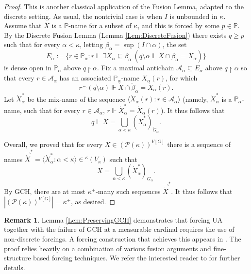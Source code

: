 \documentclass{article}
\theoremstyle{definition}
\newtheorem{remark}[definition]{Remark}
\theoremstyle{plain}
\newcommand{\po}{\mathbb{P}}
\newcommand{\la}{\langle}
\newcommand{\ra}{\rangle}
\newcommand{\uhr}{\upharpoonright}
\begin{document}
\begin{proof}
    This is another classical application of the Fusion Lemma,  adapted to the discrete setting. As usual, the nontrivial case is when $I$ is unbounded in $\kappa$. Assume that $\dot{X}$ is a $\po$-name for a subset of $\kappa$, and this is forced by some $p\in \po$. By the Discrete Fusion Lemma (Lemma \ref{Lem:DiscreteFusion}) there exists $q\geq p$ such that for every $\alpha<\kappa$, letting $\beta_\alpha = \sup(I\cap \alpha)$, the set
    $$ E_\alpha:=\{ r\in \po_\alpha \colon r\Vdash \exists X_\alpha\subseteq \beta_\alpha \ \left(q\setminus \alpha \Vdash \dot{X}\cap \beta_\alpha = X_\alpha \right) \}  $$
    is dense open in $\po_\alpha$ above $q\uhr \alpha$. Fix a maximal antichain $\mathcal{A}_\alpha\subseteq E_\alpha$ above $q\uhr \alpha$ so that every $r\in \mathcal{A}_\alpha$ has an associated $\po_\alpha$-name $\dot{X}_\alpha(r)$, for which 
    $$ r{}^\frown (q\setminus \alpha)\Vdash \dot{X}\cap \check{\beta}_\alpha = \dot{X}_\alpha(r). $$
    Let $\dot{X}^*_\alpha$ be the mix-name of the sequence $\la \dot{X}_\alpha(r) \colon r\in \mathcal{A}_\alpha  \ra$ (namely, $\dot{X}^*_\alpha$ is a $\po_\alpha$-name, such that for every $r\in \mathcal{A}_\alpha$, $r\Vdash \dot{X}^*_\alpha = \dot{X}_\alpha(r)$). It thus follows that $$q\Vdash \dot{X} = \bigcup_{\alpha<\kappa} \left( \dot{X}^*_\alpha \right)_{\dot{G}_{\alpha}}.$$

    Overall, we proved that for every $X\in \left( \mathcal{P}(\kappa) \right)^{V[G]}$ there is a sequence of names $\vec{\dot{X}}^* = \la \dot{X}^*_\alpha \colon \alpha<\kappa \ra\in {}^\kappa (V_\kappa)$ such that 
    $$X = \bigcup_{\alpha<\kappa} \left( \dot{X}^*_\alpha \right)_{G_\alpha}.$$ By {\rm GCH}, there are at most $\kappa^+$-many such sequences $\vec{\dot{X}}^*$. It thus follows that $\left| \left( \mathcal{P}(\kappa) \right)^{V[G]} \right| = \kappa^+$, as desired.
\end{proof}

\begin{remark}
Lemma \ref{Lem:PreservingGCH} demonstrates that forcing {\rm UA} together with the failure of {\rm GCH} at a measurable cardinal requires the use of non-discrete forcings. A forcing construction that achieves this appears in \cite{BenNeriaKaplan}. The proof  relies heavily on a combination of various fusion arguments and  fine-structure based forcing techniques. We refer the interested reader to \cite{BenNeriaKaplan} for further details.
\end{remark}
\end{document}
